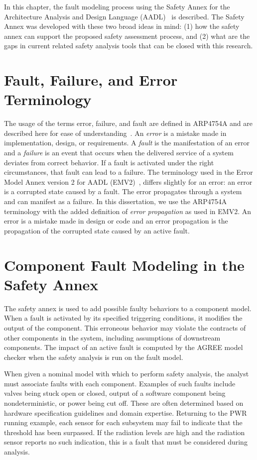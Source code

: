 In this chapter, the fault modeling process using the Safety Annex for the Architecture Analysis and Design Language (AADL)~\cite{AADL_Standard} is described. The Safety Annex was developed with these two broad ideas in mind: (1) how the safety annex can support the proposed safety assessment process, and (2) what are the gaps in current related safety analysis tools that can be closed with this research.

\section{Fault, Failure, and Error Terminology}
The usage of the terms error, failure, and fault are defined in ARP4754A and are described here for ease of understanding~\cite{SAE:ARP4754A}. An \textit{error} is a mistake made in implementation, design, or requirements. A \textit{fault} is the manifestation of an error and a \textit{failure} is an event that occurs when the delivered service of a system deviates from correct behavior. If a fault is activated under the right circumstances, that fault can lead to a failure. The terminology used in the Error Model Annex version 2 for AADL (EMV2)~\cite{EMV2}, differs slightly for an error: an error is a corrupted state caused by a fault. The error propagates through a system and can manifest as a failure. In this dissertation, we use the ARP4754A terminology with the added definition of \textit{error propagation} as used in EMV2. An error is a mistake made in design or code and an error propagation is the propagation of the corrupted state caused by an active fault. 




\section{Component Fault Modeling in the Safety Annex}
The safety annex is used to add possible faulty behaviors to a component model. When a fault is activated by its specified triggering conditions, it modifies the output of the component. This erroneous behavior may violate the contracts of other components in the system, including assumptions of downstream components. The impact of an active fault is computed by the AGREE model checker when the safety analysis is run on the fault model. 

When given a nominal model with which to perform safety analysis, the analyst must associate faults with each component. Examples of such faults include valves being stuck open or closed, output of a software component being nondeterministic, or power being cut off. These are often determined based on hardware specification guidelines and domain expertise. Returning to the PWR running example, each sensor for each subsystem may fail to indicate that the threshold has been surpassed. If the radiation levels are high and the radiation sensor reports no such indication, this is a fault that must be considered during analysis. 

